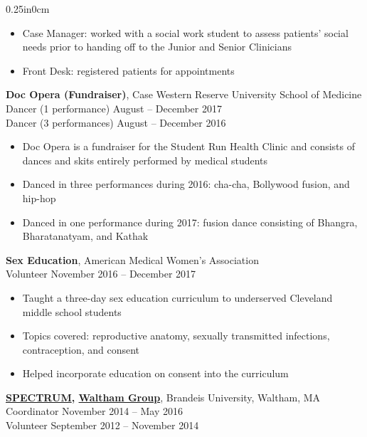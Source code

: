 \documentclass[11pt]{article}
\newcommand{\blockindent}{0.25in}
\newcommand{\job}[4]{
\textbf{#1}, {#2} \\
{#3} \hfill {#4}\\
}
\newcommand{\jobtitle}[2]{
{#1} \hfill {#2}\\
}
\begin{document}
\begin{adjustwidth}{\blockindent}{0cm}
\begin{itemize}
	\item Case Manager: worked with a social work student to assess patients' social needs prior to handing off to the Junior and Senior Clinicians

	\item Front Desk: registered patients for appointments

\end{itemize}

\job{Doc Opera (Fundraiser)}{Case Western Reserve University School of Medicine}{Dancer (1 performance)}{August -- December 2017}
\jobtitle{Dancer (3 performances)}{August -- December 2016}
\begin{itemize}

	\item Doc Opera is a fundraiser for the Student Run Health Clinic and consists of dances and skits entirely performed by medical students

	\item Danced in three performances during 2016: cha-cha, Bollywood fusion, and hip-hop

	\item Danced in one performance during 2017: fusion dance consisting of Bhangra, Bharatanatyam, and Kathak

\end{itemize}

\job{Sex Education}{American Medical Women's Association}{Volunteer}{November 2016 -- December 2017}
\begin{itemize}

	\item Taught a three-day sex education curriculum to underserved Cleveland middle school students

	\item Topics covered: reproductive anatomy, sexually transmitted infections, contraception, and consent

	\item Helped incorporate education on consent into the curriculum

\end{itemize}

\job{\href{http://www.brandeis.edu/walthamgroup/programs/spectrum.html}{SPECTRUM}{\normalfont ,} \href{http://www.brandeis.edu/walthamgroup/index.html}{Waltham Group}}{Brandeis University, Waltham, MA}{Coordinator}{November 2014 -- May 2016}
\jobtitle{Volunteer}{September 2012 -- November 2014}
\begin{itemize}


\end{itemize}
\end{adjustwidth}
\end{document}
